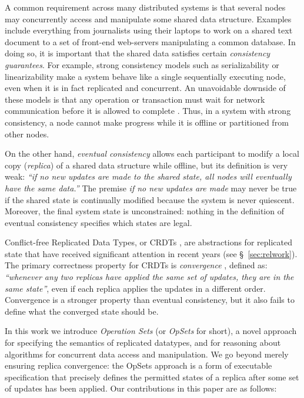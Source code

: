\documentclass[11pt]{article}
\begin{document}
A common requirement across many distributed systems is that several nodes may concurrently access and manipulate some shared data structure.
Examples include everything from journalists using their laptops to work on a shared text document to a set of front-end web-servers manipulating a common database.
In doing so, it is important that the shared data satisfies certain \emph{consistency guarantees}.
For example, strong consistency models such as serializability \cite{Kleppmann:2017wj} or linearizability \cite{Herlihy:1990jq} make a system behave like a single sequentially executing node, even when it is in fact replicated and concurrent.
An unavoidable downside of these models is that any operation or transaction must wait for network communication before it is allowed to complete \cite{Davidson:1985hv,Gilbert:2002il}.
Thus, in a system with strong consistency, a node cannot make progress while it is offline or partitioned from other nodes.

On the other hand, \emph{eventual consistency} \cite{Bailis:2013jc,Burckhardt:2014hy,Terry:1994fp,Vogels:2009ca} allows each participant to modify a local copy (\emph{replica}) of a shared data structure while offline, but its definition is very weak: \emph{``if no new updates are made to the shared state, all nodes will eventually have the same data.''}
The premise \emph{if no new updates are made} may never be true if the shared state is continually modified because the system is never quiescent.
Moreover, the final system state is unconstrained: nothing in the definition of eventual consistency specifies which states are legal.

Conflict-free Replicated Data Types, or CRDTs \cite{Shapiro:2011wy,Shapiro:2011un}, are abstractions for replicated state that have received significant attention in recent years (see \S~\ref{sec:relwork}).
The primary correctness property for CRDTs is \emph{convergence} \cite{Shapiro:2011un,Gomes:2017gy}, defined as: \emph{``whenever any two replicas have applied the same set of updates, they are in the same state''}, even if each replica applies the updates in a different order.
Convergence is a stronger property than eventual consistency, but it also fails to define what the converged state should be.

In this work we introduce \emph{Operation Sets} (or \emph{OpSets} for short), a novel approach for specifying the semantics of replicated datatypes, and for reasoning about algorithms for concurrent data access and manipulation.
We go beyond merely ensuring replica convergence: the OpSets approach is a form of executable specification that precisely defines the permitted states of a replica after some set of updates has been applied.
Our contributions in this paper are as follows:
\end{document}
